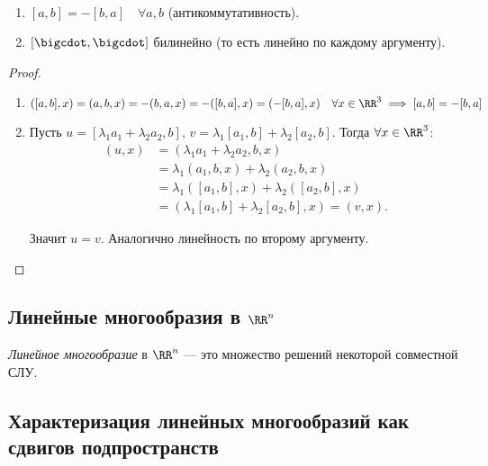 \begin{proposal}~
    \begin{enumerate}
    \item $[a, b] = -[b, a] \quad \forall a, b$ (антикоммутативность).
    \item $[\bigcdot, \bigcdot]$ билинейно (то есть линейно по каждому аргументу).
    \end{enumerate}
\end{proposal}

\begin{proof}~
    \begin{enumerate}
    \item 
        $([a, b], x) = (a, b, x) = -(b, a, x) = -([b, a], x) = (-[b, a], x) \quad \forall x \in \RR^3 \implies [a, b] = -[b, a]$

    \item
        Пусть $u = [\lambda_1 a_1 + \lambda_2 a_2, b]$, $v = \lambda_1 [a_1, b] + \lambda_2 [a_2, b]$.
        Тогда $\forall x \in \RR^3$:
        \begin{align*}
            (u, x) &= (\lambda_1 a_1 + \lambda_2 a_2, b, x) \\
                   &= \lambda_1 (a_1, b, x) + \lambda_2 (a_2, b, x) \\
                   &= \lambda_1 ([a_1, b], x) + \lambda_2([a_2, b], x) \\
                   &= (\lambda_1[a_1, b] + \lambda_2[a_2, b], x) = (v, x)
        .\end{align*}

        Значит $u = v$. Аналогично линейность по второму аргументу.
        \qedhere
    \end{enumerate}
\end{proof}


\subsection{Линейные многообразия в $\RR^n$}

\begin{definition}
    \textit{Линейное многообразие} в $\RR^n$ --- это множество решений некоторой совместной СЛУ.
\end{definition}


\subsection{Характеризация линейных многообразий как сдвигов подпространств}

